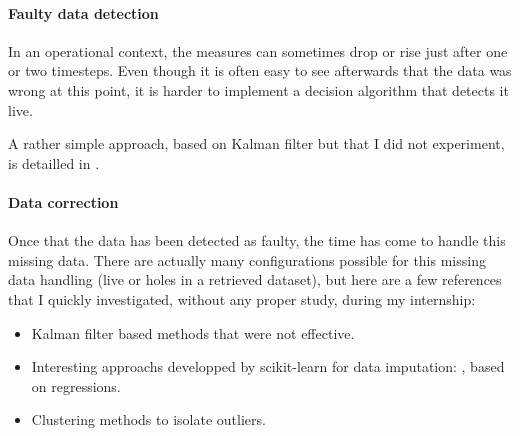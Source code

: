 \paragraph{Faulty data detection}
\indent

In an operational context, the measures can sometimes drop or rise just after one or two timesteps. Even though it is often easy to see afterwards that the data was wrong at this point, it is harder to implement a decision algorithm that detects it live. 

A rather simple approach, based on Kalman filter but that I did not experiment, is detailled in \cite{kerhascoet_sensor_2017}.

\paragraph{Data correction}
\indent

Once that the data has been detected as faulty, the time has come to handle this missing data. There are actually many configurations possible for this missing data handling (live or holes in a retrieved dataset), but here are a few references that I quickly investigated, without any proper study, during my internship:

\begin{itemize}
    \item Kalman filter based methods that were not effective.
    \item Interesting approachs developped by scikit-learn for data imputation: \cite{sklearnmissingdata}, based on regressions.
    \item Clustering methods to isolate outliers.
\end{itemize}